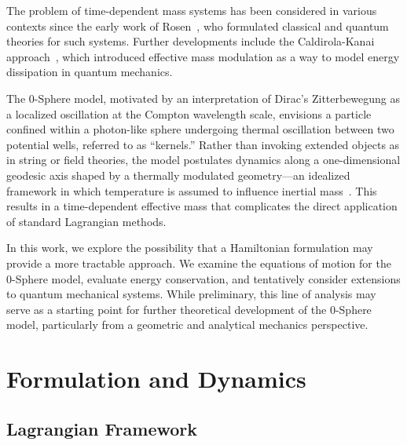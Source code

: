 \documentclass[%
 reprint,
 amsmath,amssymb,
 aps,
]{revtex4-1}
\numberwithin{equation}{section}%
\begin{document}
The problem of time-dependent mass systems has been considered in various contexts since the early work of Rosen~\cite{rosen1965}, who formulated classical and quantum theories for such systems. Further developments include the Caldirola-Kanai approach~\cite{caldirola1941,kanai1948}, which introduced effective mass modulation as a way to model energy dissipation in quantum mechanics.

The 0-Sphere model, motivated by an interpretation of Dirac’s Zitterbewegung as a localized oscillation at the Compton wavelength scale, envisions a particle confined within a photon-like sphere undergoing thermal oscillation between two potential wells, referred to as ``kernels.'' Rather than invoking extended objects as in string or field theories, the model postulates dynamics along a one-dimensional geodesic axis shaped by a thermally modulated geometry—an idealized framework in which temperature is assumed to influence inertial mass~\cite{thermodynamics_inertia}. This results in a time-dependent effective mass that complicates the direct application of standard Lagrangian methods.

In this work, we explore the possibility that a Hamiltonian formulation may provide a more tractable approach. We examine the equations of motion for the 0-Sphere model, evaluate energy conservation, and tentatively consider extensions to quantum mechanical systems. While preliminary, this line of analysis may serve as a starting point for further theoretical development of the 0-Sphere model, particularly from a geometric and analytical mechanics perspective.



\section{Formulation and Dynamics}


\subsection{Lagrangian Framework}
\end{document}
